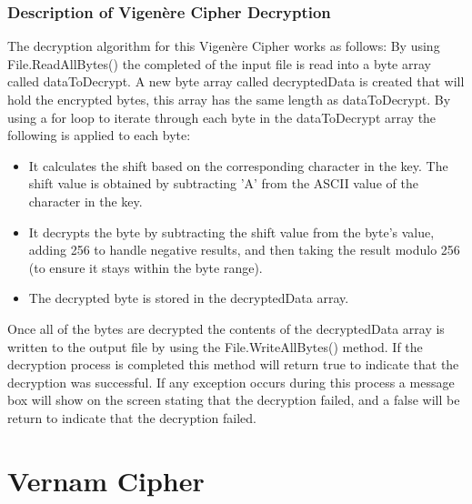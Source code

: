 \documentclass[a4paper,oneside,11pt]{book}
\begin{document}
\subsection{Description of Vigenère Cipher Decryption}

The decryption algorithm for this Vigenère Cipher works as follows:
By using File.ReadAllBytes() the completed of the input file is read into a byte array called dataToDecrypt. A new byte array called decryptedData is created that will hold the encrypted bytes, this array has the same length as dataToDecrypt. By using a for loop to iterate through each byte in the dataToDecrypt array the following is applied to each byte:
\begin{itemize}
    \item 
        It calculates the shift based on the corresponding character in the key. The shift value is obtained by subtracting 'A' from the ASCII value of the character in the key.
    \item 
        It decrypts the byte by subtracting the shift value from the byte's value, adding 256 to handle negative results, and then taking the result modulo 256 (to ensure it stays within the byte range).
    \item 
        The decrypted byte is stored in the decryptedData array.
\end{itemize}
Once all of the bytes are decrypted the contents of the decryptedData array is written to the output file by using the File.WriteAllBytes() method. If the decryption process is completed this method will return true to indicate that the decryption was successful. If any exception occurs during this process a message box will show on the screen stating that the decryption failed, and a false will be return to indicate that the decryption failed.

\chapter[Vernam Cipher]{Vernam Cipher}
\end{document}
